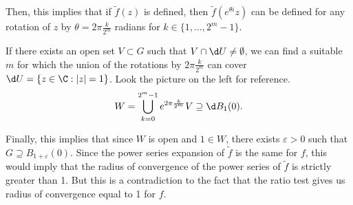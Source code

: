 \begin{multicols}{2}
    \begin{figure}[H]
        \centering
        
    \end{figure}

    Then, this implies that if $\tilde{f}(z)$ is defined, then $\tilde{f}(e^{\theta i} z)$ can be defined for any rotation of $z$ by $\theta = 2\pi \frac{k}{2^m}$ radians for $k \in \{1,\ldots, 2^m-1\}$. 
    
    If there exists an open set $V \subset G$ such that $V \cap \d U \neq \emptyset$, we can find a suitable $m$ for which the union of the rotations by $2\pi \frac{k}{2^m}$ can cover $\d U = \{z \in \C : |z| = 1\}$. Look the picture on the left for reference.
    \[ W = \bigcup_{k = 0}^{2^m - 1} e^{2\pi \frac{k}{2^m}} V \supseteq \d B_1(0). \]
\end{multicols}

Finally, this implies that since $W$ is open and $1\in W$, there exists $\varepsilon > 0$ such that $G \supseteq B_{1+\varepsilon}(0)$. Since the power series expansion of $\tilde{f}$ is the same for $f$, this would imply that the radius of convergence of the power series of $\tilde{f}$ is strictly greater than 1. But this is a contradiction to the fact that the ratio test gives us radius of convergence equal to 1 for $f$.